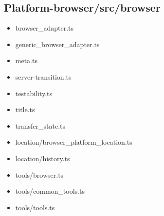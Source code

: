 \subsection{Platform-browser/src/browser}


\begin{itemize}
  \item browser\_adapter.ts
  \item generic\_browser\_adapter.ts
  \item meta.ts
  \item server-transition.ts
  \item testability.ts
  \item title.ts
  \item transfer\_state.ts
  \item location/browser\_platform\_location.ts
  \item location/history.ts
  \item tools/browser.ts
  \item tools/common\_tools.ts
  \item tools/tools.ts
\end{itemize}















